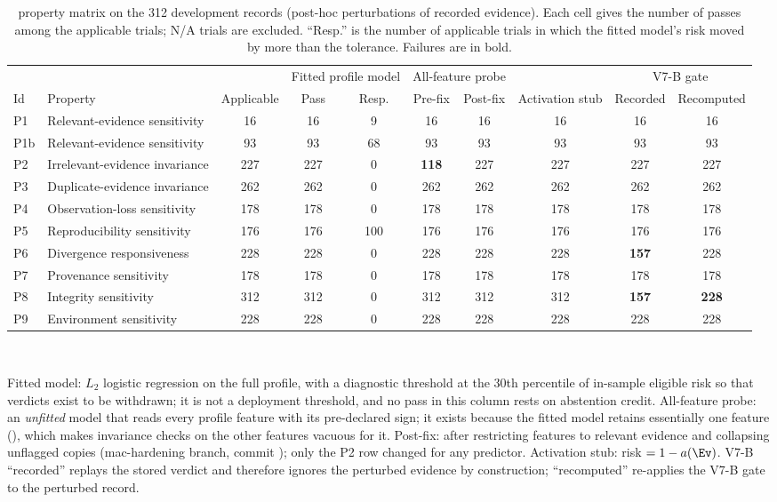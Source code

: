 \begin{table}[!t]
\caption{\ers{} property matrix on the 312 development records (post-hoc perturbations of recorded evidence). Each cell gives the number of passes among the applicable trials; N/A trials are excluded. ``Resp.'' is the number of applicable trials in which the fitted model's risk moved by more than the tolerance. Failures are in bold.}
\label{tab:ers}
\centering
\footnotesize
\setlength{\tabcolsep}{4pt}
\begin{tabular}{|l|l|c|c|c|c|c|c|c|c|}
\hline
 & & & \multicolumn{2}{c|}{Fitted profile model} & \multicolumn{2}{c|}{All-feature probe} & & \multicolumn{2}{c|}{V7-B gate} \\
Id & Property & Applicable & Pass & Resp. & Pre-fix & Post-fix & Activation stub & Recorded & Recomputed \\
\hline
P1 & Relevant-evidence sensitivity & 16 & 16 & 9 & 16 & 16 & 16 & 16 & 16 \\
P1b & Relevant-evidence sensitivity & 93 & 93 & 68 & 93 & 93 & 93 & 93 & 93 \\
P2 & Irrelevant-evidence invariance & 227 & 227 & 0 & \textbf{118} & 227 & 227 & 227 & 227 \\
P3 & Duplicate-evidence invariance & 262 & 262 & 0 & 262 & 262 & 262 & 262 & 262 \\
P4 & Observation-loss sensitivity & 178 & 178 & 0 & 178 & 178 & 178 & 178 & 178 \\
P5 & Reproducibility sensitivity & 176 & 176 & 100 & 176 & 176 & 176 & 176 & 176 \\
P6 & Divergence responsiveness & 228 & 228 & 0 & 228 & 228 & 228 & \textbf{157} & 228 \\
P7 & Provenance sensitivity & 178 & 178 & 0 & 178 & 178 & 178 & 178 & 178 \\
P8 & Integrity sensitivity & 312 & 312 & 0 & 312 & 312 & 312 & \textbf{157} & \textbf{228} \\
P9 & Environment sensitivity & 228 & 228 & 0 & 228 & 228 & 228 & 228 & 228 \\
\hline
\end{tabular}
\\[3pt]
\parbox{\textwidth}{\scriptsize Fitted model: $L_2$ logistic regression on the full profile, with a diagnostic threshold at the 30th percentile of in-sample eligible risk so that \NDO{} verdicts exist to be withdrawn; it is not a deployment threshold, and no pass in this column rests on abstention credit. All-feature probe: an \emph{unfitted} model that reads every profile feature with its pre-declared sign; it exists because the fitted model retains essentially one feature (), which makes invariance checks on the other features vacuous for it. Post-fix: after restricting features to relevant evidence and collapsing unflagged copies (mac-hardening branch, commit ); only the P2 row changed for any predictor. Activation stub: risk $=1-a(\Ev)$. V7-B ``recorded'' replays the stored verdict and therefore ignores the perturbed evidence by construction; ``recomputed'' re-applies the V7-B gate to the perturbed record.}
\end{table}

